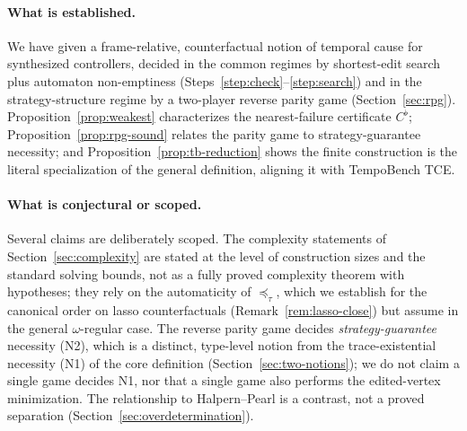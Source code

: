 \documentclass[11pt]{article}
\theoremstyle{remark}
\begin{document}
\paragraph{What is established.} We have given a frame-relative, counterfactual
notion of temporal cause for synthesized controllers, decided in the common
regimes by shortest-edit search plus automaton non-emptiness
(Steps~\ref{step:check}--\ref{step:search}) and in
the strategy-structure regime by a two-player reverse parity game
(Section~\ref{sec:rpg}). Proposition~\ref{prop:weakest} characterizes the
nearest-failure certificate \(C^{\flat}\); Proposition~\ref{prop:rpg-sound}
relates the parity game to strategy-guarantee necessity; and
Proposition~\ref{prop:tb-reduction} shows the finite construction is the literal
specialization of the general definition, aligning it with TempoBench TCE.

\paragraph{What is conjectural or scoped.} Several claims are deliberately scoped.
The complexity statements of Section~\ref{sec:complexity} are stated at the level
of construction sizes and the standard solving bounds, not as a fully proved
complexity theorem with hypotheses; they rely on the automaticity of
\(\preceq_\tau\), which we establish for the canonical order on lasso
counterfactuals (Remark~\ref{rem:lasso-close}) but assume in the general
\(\omega\)-regular case. The reverse parity game decides \emph{strategy-guarantee}
necessity (N2), which is a distinct, type-level notion from the trace-existential
necessity (N1) of the core definition (Section~\ref{sec:two-notions}); we do not
claim a single game decides N1, nor that a single game also performs the
edited-vertex minimization. The relationship to Halpern--Pearl is a contrast, not
a proved separation (Section~\ref{sec:overdetermination}).
\end{document}
